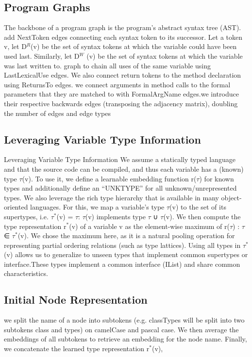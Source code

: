 \documentclass{article}
\begin{document}
\subsection{Program Graphs}
The backbone of a program graph is the program’s abstract syntax tree (AST). add NextToken edges connecting each syntax token to its successor. Let a token v, let D$^R$(v) be the set of syntax tokens at which the variable could have been used last. Similarly, let D$^W$ (v) be the set of syntax tokens at which the variable was last written to. graph to chain all uses of the same variable using LastLexicalUse edges. We also connect return tokens to the method declaration using ReturnsTo edges. we connect arguments in method calls to the formal parameters that they are matched to with FormalArgName edges.we introduce their respective backwards edges (transposing the adjacency matrix), doubling the number of edges and edge types

\subsection{Leveraging Variable Type Information}
Leveraging Variable Type Information We assume a statically typed language and that the source code can be compiled, and thus each variable has a (known) type $\tau$(v). To use it, we define a learnable embedding function r($\tau$) for known types and additionally define an “UNKTYPE” for all unknown/unrepresented types. We also leverage the rich type hierarchy that is available in many object-oriented languages. For this, we map a variable’s type $\tau$(v) to the set of its supertypes, i.e. $\tau^\ast$(v) = {$\tau$: $\tau$(v) implements type $\tau$} ∪ {$\tau$(v)}. We then compute the type representation r$^\ast$(v) of a variable v as the element-wise maximum of {r($\tau$) : $\tau$ ∈ $\tau^\ast$(v)}. We chose the maximum here, as it is a natural pooling operation for representing partial ordering relations (such as type lattices). Using all types in $\tau^\ast$(v) allows us to generalize to unseen types that implement common supertypes or interface.These types implement a common interface (IList) and share common characteristics.

\subsection{Initial Node Representation}
we split the name of a node into subtokens (e.g. classTypes will be split into two subtokens class and types) on camelCase and pascal case. We then average the embeddings of all subtokens to retrieve an embedding for the node name. Finally, we concatenate the learned type representation r$^{\ast}$(v),
\end{document}
